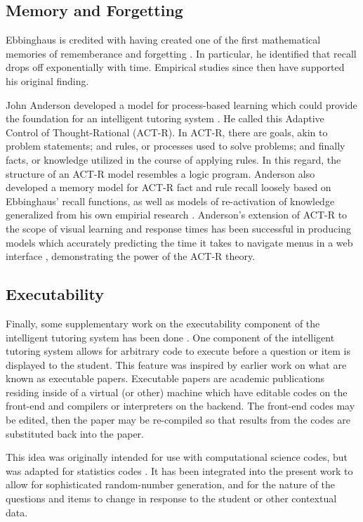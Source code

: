 \subsection{Memory and Forgetting}

Ebbinghaus is credited with having created one of the first mathematical
memories of rememberance and forgetting \cite{ebbinghaus}.  In particular, he
identified that recall drops off exponentially with time.  Empirical studies
since then have supported his original finding.

John Anderson developed a model for process-based learning which could provide
the foundation for an intelligent tutoring system \cite{anderson1996act}.  He
called this Adaptive Control of Thought-Rational (ACT-R).  In ACT-R, there are
goals, akin to problem statements; and rules, or processes used to solve
problems; and finally facts, or knowledge utilized in the course of applying
rules.  In this regard, the structure of an ACT-R model resembles a logic
program.  Anderson also developed a memory model for ACT-R fact and rule recall
loosely based on Ebbinghaus' recall functions, as well as models of
re-activation of knowledge generalized from his own empirial research
\cite{bacon2003assessing}.  Anderson's extension of ACT-R to the scope of
visual learning and response times has been successful in producing models
which accurately predicting the time it takes to navigate menus in a web
interface \cite{anderson1997act}, demonstrating the power of the ACT-R theory.

\subsection{Executability} 

Finally, some supplementary work on the executability component of the
intelligent tutoring system has been done \cite{castleberry2011}.  One
component of the intelligent tutoring system allows for arbitrary code to
execute before a question or item is displayed to the student.  This feature
was inspired by earlier work on what are known as executable papers.
Executable papers are academic publications residing inside of a virtual (or
other) machine which have editable codes on the front-end and compilers or
interpreters on the backend.  The front-end codes may be edited, then the
paper may be re-compiled so that results from the codes are substituted back
into the paper.  

This idea was originally intended for use with computational science codes, but
was adapted for statistics codes \cite{castleberry2013}.  It has been
integrated into the present work to allow for sophisticated random-number
generation, and for the nature of the questions and items to change in response
to the student or other contextual data.


